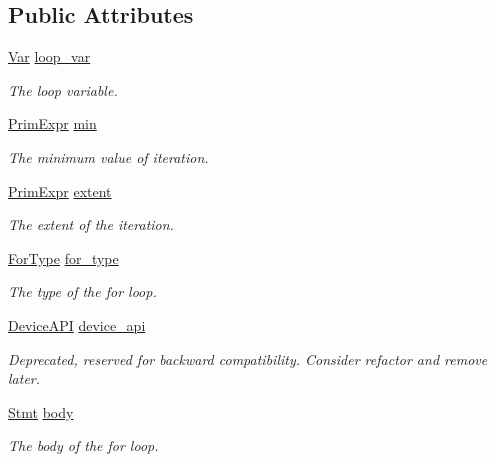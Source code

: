 \subsection*{Public Attributes}
\begin{DoxyCompactItemize}
\item 
\hyperlink{classtvm_1_1tir_1_1Var}{Var} \hyperlink{classtvm_1_1tir_1_1ForNode_a7dbf66bdcf8ed397321517f0915a0946}{loop\+\_\+var}
\begin{DoxyCompactList}\small\item\em The loop variable. \end{DoxyCompactList}\item 
\hyperlink{classtvm_1_1PrimExpr}{Prim\+Expr} \hyperlink{classtvm_1_1tir_1_1ForNode_a1d1aa2006328bd84e4911f6d43ceca5c}{min}
\begin{DoxyCompactList}\small\item\em The minimum value of iteration. \end{DoxyCompactList}\item 
\hyperlink{classtvm_1_1PrimExpr}{Prim\+Expr} \hyperlink{classtvm_1_1tir_1_1ForNode_ab54798257255b682a1aad74cec33e070}{extent}
\begin{DoxyCompactList}\small\item\em The extent of the iteration. \end{DoxyCompactList}\item 
\hyperlink{namespacetvm_1_1tir_ae35cce8e3f1e8d7366dc0d9b15536736}{For\+Type} \hyperlink{classtvm_1_1tir_1_1ForNode_a16c251793b50476f3e61ad529c5a8986}{for\+\_\+type}
\begin{DoxyCompactList}\small\item\em The type of the for loop. \end{DoxyCompactList}\item 
\hyperlink{namespacetvm_1_1tir_aed067b57db2923a07913239b2165e019}{Device\+A\+PI} \hyperlink{classtvm_1_1tir_1_1ForNode_a54688f6170879ac18d23a36beea47b6e}{device\+\_\+api}
\begin{DoxyCompactList}\small\item\em Deprecated, reserved for backward compatibility. Consider refactor and remove later. \end{DoxyCompactList}\item 
\hyperlink{classtvm_1_1tir_1_1Stmt}{Stmt} \hyperlink{classtvm_1_1tir_1_1ForNode_ac92e3680d0609f7789b08cc235095de5}{body}
\begin{DoxyCompactList}\small\item\em The body of the for loop. \end{DoxyCompactList}\end{DoxyCompactItemize}
